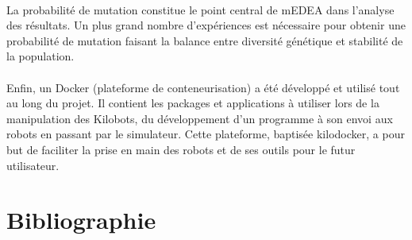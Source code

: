 \documentclass[a4paper]{article}
\begin{document}
\\La probabilité de mutation constitue le point central de mEDEA dans l'analyse des résultats. Un plus grand nombre d'expériences est nécessaire pour obtenir une probabilité de mutation faisant la balance entre diversité génétique et stabilité de la population.
\\ \\Enfin, un Docker (plateforme de conteneurisation) a été développé et utilisé tout au long du projet. Il contient les packages et applications à utiliser lors de la manipulation des Kilobots, du développement d'un programme à son envoi aux robots en passant par le simulateur. Cette plateforme, baptisée kilodocker, a pour but de faciliter la prise en main des robots et de ses outils pour le futur utilisateur.
\newpage
\section{Bibliographie}

\printbibliography
\end{document}
